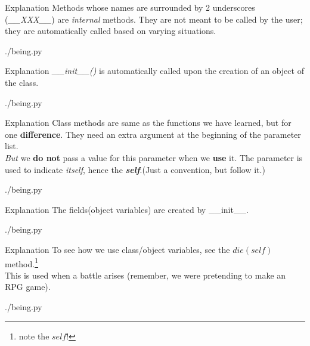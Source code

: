 \documentclass{beamer}
\begin{document}
\begin{frame}{Explanation}
  Methods whose names are surrounded by 2 underscores
  (\textit{\_\_XXX\_\_}) are
  \textit{internal} methods.
  They are not meant to be called by the user; they are
  automatically called based on varying situations.
  \begin{lstinputlisting}[firstline=1, lastline=7]
    {./being.py}
  \end{lstinputlisting}
\end{frame}

\begin{frame}{Explanation}
  \textit{\_\_init\_\_()} is automatically called upon the creation of an object of the
  class.
  \begin{lstinputlisting}[firstline=7, lastline=14]
    {./being.py}
  \end{lstinputlisting}
\end{frame}

\begin{frame}{Explanation}
  Class methods are same as the functions we have learned, but for one
  \textbf{difference}. They need an extra argument at the beginning of the
  parameter list.\\\textit{But} we \textbf{do not} pass a value for this parameter when we
  \textbf{use} it. The parameter is used to indicate \textit{itself}, hence the
  \textit{\textbf{self}}.(Just a convention, but follow it.)
  \begin{lstinputlisting}[firstline=5, lastline=8]
    {./being.py}
  \end{lstinputlisting}
\end{frame}

\begin{frame}{Explanation}
  The fields(object variables) are created by \_\_init\_\_.\\
  \begin{lstinputlisting}[firstline=7, lastline=12]
    {./being.py}
  \end{lstinputlisting}
\end{frame}

\begin{frame}{Explanation}
  To see how we use class/object variables, see the $die(self)$
  method.\footnote{note the $self$!}\\
  This is used when a battle arises (remember, we were pretending to make an RPG game).
  \begin{lstinputlisting}[firstline=17, lastline=19]
    {./being.py}
  \end{lstinputlisting}
\end{frame}
\end{document}
